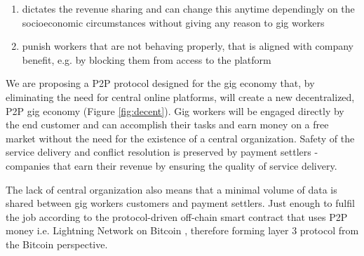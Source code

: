 \documentclass{article}
\begin{document}
\begin{enumerate}
\item dictates the revenue sharing and can change this anytime dependingly on the socioeconomic circumstances without giving any reason to gig workers

\item punish workers that are not behaving properly, that is aligned with company benefit, e.g. by blocking them from access to the platform
\end{enumerate}

We are proposing a P2P protocol designed for the gig economy that, by eliminating the need for central online platforms, will create a new decentralized, P2P gig economy (Figure \ref{fig:decent}). Gig workers will be engaged directly by the end customer and can accomplish their tasks and earn money on a free market without the need for the existence of a central organization. Safety of the service delivery and conflict resolution is preserved by payment settlers - companies that earn their revenue by ensuring the quality of service delivery.

The lack of central organization also means that a minimal volume of data is shared between gig workers customers and payment settlers. Just enough to fulfil the job according to the protocol-driven off-chain smart contract that uses P2P money i.e. Lightning Network \cite{poon2016bitcoin} on Bitcoin \cite{nakamoto2009bitcoin}, therefore forming layer 3 protocol from the Bitcoin perspective.
\end{document}

